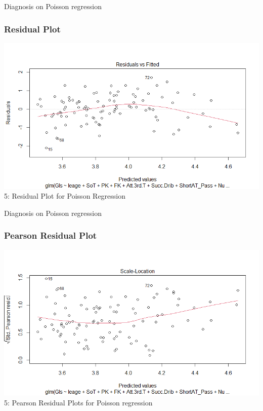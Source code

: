 \documentclass[11pt]{beamer}
\begin{document}
\begin{frame}{Diagnosis on Poisson regression}
	\frametitle{Residual Plot}
	\includegraphics[scale=0.5]{gls4}\\
	\figurename 5: Residual Plot for Poisson Regression
\end{frame}
\begin{frame}{Diagnosis on Poisson regression}
	\frametitle{Pearson Residual Plot}
	\includegraphics[scale=0.5]{gls5}\\
	\figurename 5: Pearson Residual Plots for Poisson regression
\end{frame}
\end{document}
